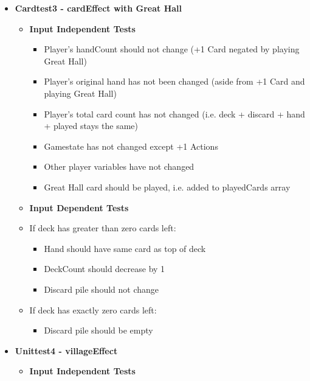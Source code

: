 \documentclass[11pt,letterpaper]{article}
\begin{document}
\begin{enumerate}[label=\Roman*.]
\begin{itemize}[leftmargin=*]
      \item \textbf{Cardtest3 - cardEffect with Great Hall}
        \begin{itemize}[leftmargin=*, label={}]
          \item \textbf{Input Independent Tests}
            \begin{itemize}[leftmargin=*]
              \item Player's handCount should not change (+1 Card negated by playing Great Hall)
              \item Player's original hand has not been changed (aside from +1 Card and playing Great Hall)
              \item Player's total card count has not changed (i.e. deck + discard + hand + played stays the same)
              \item Gamestate has not changed except +1 Actions
              \item Other player variables have not changed
              \item Great Hall card should be played, i.e. added to playedCards array
            \end{itemize}
          \item \textbf{Input Dependent Tests}
          \item If deck has greater than zero cards left: 
            \begin{itemize}[leftmargin=*]
              \item Hand should have same card as top of deck
              \item DeckCount should decrease by 1
              \item Discard pile should not change
            \end{itemize}
          \item If deck has exactly zero cards left:
            \begin{itemize}[leftmargin=*]
              \item Discard pile should be empty
            \end{itemize}
        \end{itemize}

      \item \textbf{Unittest4 - villageEffect}

        \begin{itemize}[leftmargin=*, label={}]
          \item \textbf{Input Independent Tests}


\end{itemize}
\end{itemize}
\end{enumerate}
\end{document}
